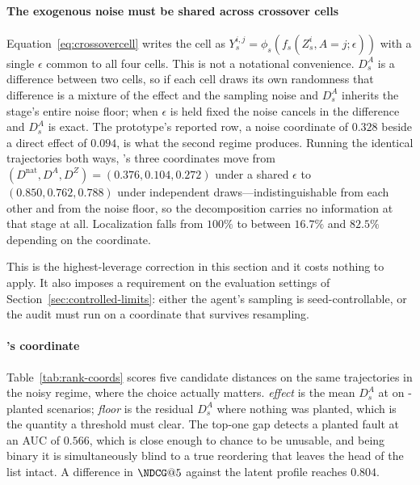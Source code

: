 \paragraph{The exogenous noise must be shared across crossover cells}
Equation~\eqref{eq:crossovercell} writes the cell as
$Y_s^{i,j} = \phi_s(f_s(Z_s^{i}, A{=}j; \epsilon))$ with a single $\epsilon$ common to all four
cells. This is not a notational convenience. $D_s^{A}$ is a difference between two cells, so if
each cell draws its own randomness that difference is a mixture of the effect and the sampling
noise and $D_s^{A}$ inherits the stage's entire noise floor; when $\epsilon$ is held fixed the
noise cancels in the difference and $D_s^{A}$ is exact. The prototype's reported  row,
a noise coordinate of $0.328$ beside a direct effect of $0.094$, is what the second regime
produces. Running the identical trajectories both ways, 's three coordinates move
from $(D^{\mathrm{nat}}, D^{A}, D^{Z}) = (0.376, 0.104, 0.272)$ under a shared $\epsilon$ to
$(0.850, 0.762, 0.788)$ under independent draws---indistinguishable from each other and from the
noise floor, so the decomposition carries no information at that stage at all. Localization falls
from $100\%$ to between $16.7\%$ and $82.5\%$ depending on the coordinate.

This is the highest-leverage correction in this section and it costs nothing to apply. It also
imposes a requirement on the evaluation settings of Section~\ref{sec:controlled-limits}: either
the agent's sampling is seed-controllable, or the audit must run on a coordinate that survives
resampling.

\paragraph{'s coordinate}
Table~\ref{tab:rank-coords} scores five candidate distances on the same trajectories in the
noisy regime, where the choice actually matters. \emph{effect} is the mean $D_s^{A}$ at
 on -planted scenarios; \emph{floor} is the residual $D_s^{A}$ where
nothing was planted, which is the quantity a threshold must clear. The top-one gap detects a
planted fault at an AUC of $0.566$, which is close enough to chance to be unusable, and being
binary it is simultaneously blind to a true reordering that leaves the head of the list intact.
A difference in $\NDCG@5$ against the latent profile reaches $0.804$.

